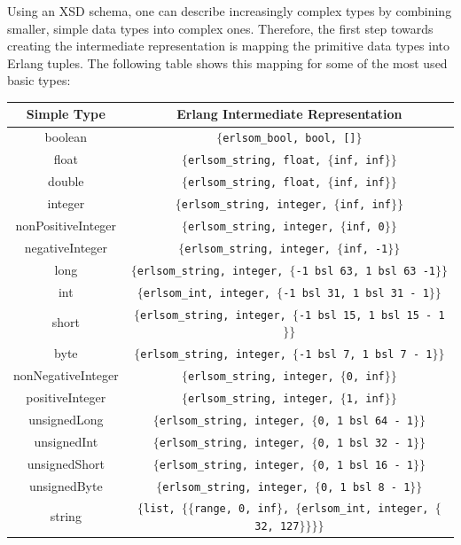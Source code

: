 \documentclass[copyright]{eptcs}
\begin{document}
Using an XSD schema, one can describe increasingly complex types by combining
smaller, simple data types into complex ones. Therefore, the first step towards 
creating the intermediate representation is mapping the primitive data types 
into Erlang tuples. The following table shows this mapping for some of the
most used basic types:

\begin{center}\footnotesize
  \begin{tabular}{cc}
    \toprule
    Simple Type & Erlang Intermediate Representation \\
    \midrule
    boolean & \texttt{$\{$erlsom\_bool, bool, []$\}$}\\
    float & \texttt{$\{$erlsom\_string, float, $\{$inf, inf$\}\}$}\\
    double & \texttt{$\{$erlsom\_string, float, $\{$inf, inf$\}\}$}\\
    integer & \texttt{$\{$erlsom\_string, integer, $\{$inf, inf$\}\}$}\\
    nonPositiveInteger & \texttt{$\{$erlsom\_string, integer, $\{$inf, 0$\}\}$}\\
    negativeInteger & \texttt{$\{$erlsom\_string, integer, $\{$inf, -1$\}\}$}\\
    long & \texttt{$\{$erlsom\_string, integer, $\{$-1 bsl 63, 1 bsl 63 -1$\}\}$}\\
    int & \texttt{$\{$erlsom\_int, integer, $\{$-1 bsl 31, 1 bsl 31 - 1$\}\}$}\\
    short & \texttt{$\{$erlsom\_string, integer, $\{$-1 bsl 15, 1 bsl 15 - 1$\}\}$}\\
    byte & \texttt{$\{$erlsom\_string, integer, $\{$-1 bsl 7, 1 bsl 7 - 1$\}\}$}\\
    nonNegativeInteger & \texttt{$\{$erlsom\_string, integer, $\{$0, inf$\}\}$}\\
    positiveInteger & \texttt{$\{$erlsom\_string, integer, $\{$1, inf$\}\}$}\\
    unsignedLong & \texttt{$\{$erlsom\_string, integer, $\{$0, 1 bsl 64 - 1$\}\}$}\\
    unsignedInt & \texttt{$\{$erlsom\_string, integer, $\{$0, 1 bsl 32 - 1$\}\}$}\\
    unsignedShort & \texttt{$\{$erlsom\_string, integer, $\{$0, 1 bsl 16 - 1$\}\}$}\\
    unsignedByte & \texttt{$\{$erlsom\_string, integer, $\{$0, 1 bsl 8 - 1$\}\}$}\\
    string & \texttt{$\{$list, $\{\{$range, 0, inf$\}$, $\{$erlsom\_int, integer, $\{$32, 127$\}\}\}\}$}\\
    \bottomrule
  \end{tabular}
\end{center}
\end{document}
